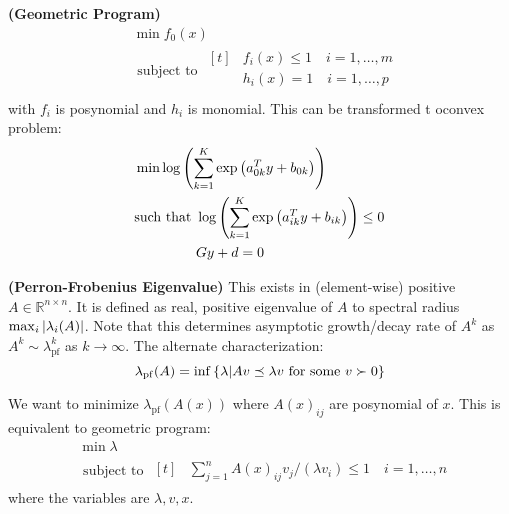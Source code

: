 \begin{definition}{\textbf{(Geometric Program)}}
    \begin{equation*}
    \begin{aligned}
        &\min f_0(x) \\
        &\text{ subject to } \begin{aligned}[t]
            &f_i(x)\le1 \quad i=1,\dots,m \\
            &h_i(x)=1 \quad i=1,\dots,p \\
        \end{aligned}
    \end{aligned}
    \end{equation*}
    with $f_i$ is posynomial and $h_i$ is monomial. This can be transformed t oconvex problem:
    \begin{equation*}
    \begin{aligned}
        &\min \log\left( \sum^K_{k=1}\exp\left( a_{0k}^Ty+b_{0k} \right) \right) \\
        &\text{such that } \begin{aligned}[t]
            &\log \left( \sum^K_{k=1}\exp\left( a_{ik}^Ty+b_{ik} \right) \right) \le 0 \\
            &Gy+d = 0
        \end{aligned}
    \end{aligned}
    \end{equation*}
\end{definition}

\begin{definition}{\textbf{(Perron-Frobenius Eigenvalue)}}
    This exists in (element-wise) positive $A\in \mathbb{R}^{n\times n}$. It is defined as real, positive eigenvalue of $A$ to spectral radius $\max_i\left| \lambda_i(A) \right|$. Note that this determines asymptotic growth/decay rate of $A^k$ as $A^k\sim\lambda^k_\text{pf}$ as $k\rightarrow\infty$. The alternate characterization:
    \begin{equation*}
        \lambda_{\operatorname{pf}}(A) = \inf\left\{ \lambda | Av\preceq\lambda v \text{ for some } v\succ0 \right\}
    \end{equation*}
\end{definition}

\begin{remark}
    We want to minimize $\lambda_{\operatorname{pf}}(A(x))$ where $A(x)_{ij}$ are posynomial of $x$. This is equivalent to geometric program:
    \begin{equation*}
    \begin{aligned}
        &\min \lambda \\
        &\text{ subject to } \begin{aligned}[t]
            &\sum^n_{j=1}A(x)_{ij}v_j/(\lambda v_i)\le1 \quad i=1,\dots,n
        \end{aligned}
    \end{aligned}
    \end{equation*}
    where the variables are $\lambda, v, x$.
\end{remark}

